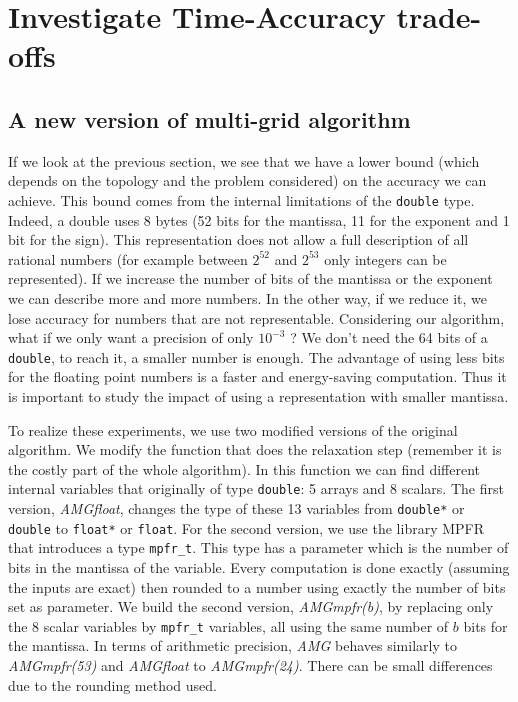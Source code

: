 \documentclass[sigplan]{acmart}
\begin{document}
\section{Investigate Time-Accuracy trade-offs}
   
   \subsection{A new version of multi-grid algorithm}
   If we look at the previous section, we see that we have a lower bound (which depends on the topology and the problem considered) on the accuracy we can achieve. This bound comes from the internal limitations of the \texttt{double} type.
   Indeed, a double uses 8 bytes (52 bits for the mantissa, 11 for the exponent and 1 bit for the sign). This representation does not allow a full description of all rational numbers (for example between $2^{52}$ and $2^{53}$ only integers can be represented).
   If we increase the number of bits of the mantissa or the exponent we can describe more and more numbers. In the other way, if we reduce it, we lose accuracy for numbers that are not representable. Considering our algorithm, what if we only want
   a precision of only $10^{-3}$ ? We don't need the 64 bits of a \texttt{double}, to reach it, a smaller number is enough. The advantage of using less bits for the floating point numbers is a faster and energy-saving computation. Thus it is important
   to study the impact of using a representation with smaller mantissa.
   
   To realize these experiments, we use two modified versions of the original algorithm. We modify the function that does the relaxation step (remember it is the costly part of the whole algorithm).
   In this function we can find different internal variables that originally of type \texttt{double}: 5 arrays and 8 scalars. The first version, \emph{AMGfloat}, changes the type of these 13 variables from \texttt{double*} or \texttt{double}
   to \texttt{float*} or \texttt{float}. For the second version, we use the library MPFR~\cite{MPFR,MPFR_link} that introduces a type \texttt{mpfr\_t}. This type has a parameter which is the number of bits in the mantissa of the variable.
   Every computation is done exactly (assuming the inputs are exact) then rounded to a number using exactly the number of bits set as parameter. We build the second version, \emph{AMGmpfr(b)}, by replacing only the 8 scalar variables
   by \texttt{mpfr\_t} variables, all using the same number of $b$ bits for the mantissa. In terms of arithmetic precision, \emph{AMG} behaves similarly to \emph{AMGmpfr(53)} and \emph{AMGfloat} to \emph{AMGmpfr(24)}. There can be small differences
   due to the rounding method used.
   
\end{document}
